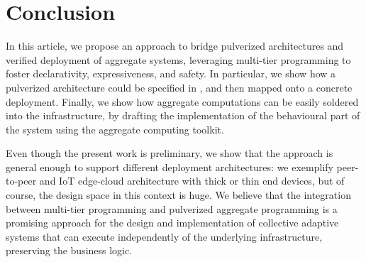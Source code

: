 \section{Conclusion}
\label{conclusion}
In this article, we propose an approach 
 to bridge pulverized architectures 
 and verified deployment of aggregate systems,
leveraging multi-tier programming to foster 
 declarativity, expressiveness, and safety. 
%
In particular, we show how a pulverized architecture could be specified in \scalaloci{},
and then mapped onto a concrete deployment.
%
Finally, we show how aggregate computations can be easily soldered into the infrastructure,
by drafting the implementation of the behavioural part of the system using the \scafi{} aggregate computing toolkit.

Even though the present work is preliminary,
we show that the approach is general enough to support different deployment architectures:
we exemplify peer-to-peer and IoT edge-cloud architecture with thick or thin end devices,
but of course, the design space in this context is huge.
%
We believe that the integration between multi-tier programming and pulverized aggregate programming is a promising approach for the design and implementation of collective adaptive systems that can execute independently of the underlying infrastructure,
preserving the business logic.

\printbibliography
